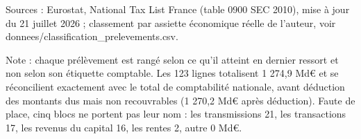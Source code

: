 Sources : Eurostat, National Tax List France (table 0900 SEC 2010), mise à jour du 21 juillet 2026 ; classement par assiette économique réelle de l'auteur, voir donnees/classification\_prelevements.csv.\par Note : chaque prélèvement est rangé selon ce qu'il atteint en dernier ressort et non selon son étiquette comptable. Les 123 lignes totalisent 1 274,9 Md\euro{} et se réconcilient exactement avec le total de comptabilité nationale, avant déduction des montants dus mais non recouvrables (1 270,2 Md\euro{} après déduction). Faute de place, cinq blocs ne portent pas leur nom : les transmissions 21, les transactions 17, les revenus du capital 16, les rentes 2, autre 0 Md\euro{}.
